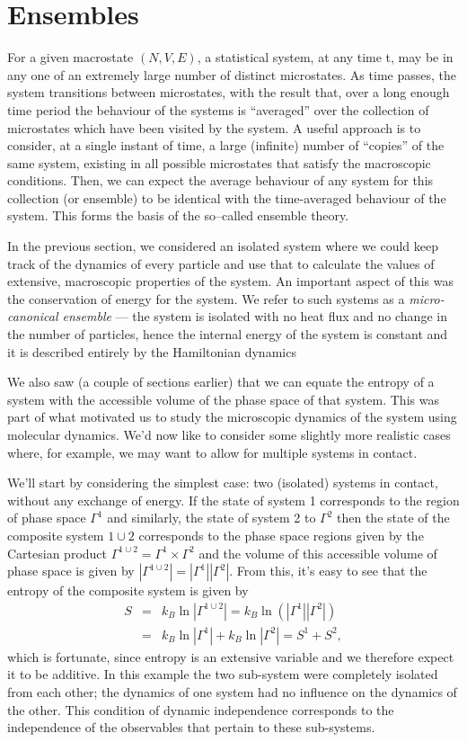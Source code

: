 \section{Ensembles}

For a given macrostate $(N, V, E)$, a statistical system, at any time t, may be in any one of an extremely large number of distinct microstates. As time passes, the system transitions between microstates, with the result that, over a long enough time period the behaviour of the systems is ``averaged'' over the collection of microstates which have been visited by the system.
A useful approach is to consider, at a single instant of time, a large (infinite) number of ``copies'' of the same system, existing in all possible microstates that satisfy the macroscopic conditions. Then, we can expect the average behaviour of any system for this collection (or ensemble) to be identical with the time-averaged behaviour of the system. This forms the basis of the so–called ensemble theory.

In the previous section, we considered an isolated system where we could keep track of the dynamics of every particle and use that to calculate the values of extensive, macroscopic properties of the system. An important aspect of this was the conservation of energy for the system. We refer to such systems as a \emph{micro-canonical ensemble} --- the system is isolated with no heat flux and no change in the number of particles, hence the internal energy of the system is constant and it is described entirely by the Hamiltonian dynamics

We also saw (a couple of sections earlier) that we can equate the entropy of a system with the accessible volume of the phase space of that system. This was part of what motivated us to study the microscopic dynamics of the system using molecular dynamics.  We'd now like to consider some slightly more realistic cases where, for example, we may want to allow for multiple systems in contact.

We'll start by considering the simplest case: two (isolated) systems in contact, without any exchange of energy. If the state of system 1 corresponds to the region of phase space $\Gamma^1$ and similarly, the state of system 2 to $\Gamma^2$ then the state of the composite system $1\cup 2$ corresponds to the phase space regions given by the Cartesian product $\Gamma^{1\cup 2}=\Gamma^1\times\Gamma^2$ and the volume of this accessible volume of phase space is given by $|\Gamma^{1\cup 2}|=|\Gamma^1||\Gamma^2|$. From this, it's easy to see that the entropy of the composite system is given by
\begin{eqnarray*}
	S &=& k_B\ln|\Gamma^{1\cup 2}| = k_B\ln(|\Gamma^1||\Gamma^2|)\\
		&=& k_B\ln|\Gamma^1| + k_B\ln|\Gamma^2| = S^1 + S^2,
\end{eqnarray*}
which is fortunate, since entropy is an extensive variable and we therefore expect it to be additive.
In this example the two sub-system were completely isolated from each other; the dynamics of one system had no influence on the dynamics of the other. This condition of dynamic independence corresponds to the independence of the observables that pertain to these sub-systems.

